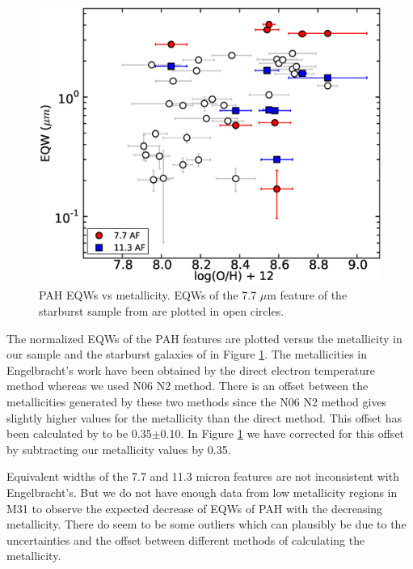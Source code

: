 \documentclass[useAMS,usenatbib,a4paper]{mn2e}
\begin{document}
\begin{figure}

\centering
\includegraphics[scale=0.27]{./oxyvseqw.eps}
\caption{ PAH EQWs vs metallicity. EQWs of the 7.7 $\mu$m feature of the starburst sample from \citet{Engelbracht_2008} are plotted in open circles.}
\label{metalicityVseqw}
\end{figure}

	The normalized EQWs of the PAH features are plotted versus the metallicity in our sample and the starburst galaxies of \citet{Engelbracht_2008} in Figure \ref{metalicityVseqw}. The metallicities in Engelbracht's work have been obtained by the direct electron temperature method \citep{Skillman1998} whereas we used N06 N2 method. There is an offset between the metallicities generated by these two methods since the N06 N2 method gives slightly higher values for the metallicity than the direct method. This offset has been calculated by \citet{Mitchel2014} to be 0.35$\pm$0.10. In Figure \ref{metalicityVseqw} we have corrected for this offset by subtracting our metallicity values by 0.35. 
	
	Equivalent widths of the 7.7 and 11.3 micron features are not inconsistent with Engelbracht's. But we do not have enough data from low metallicity regions in M31 to observe the expected decrease of EQWs of PAH with the decreasing metallicity.  There do seem to be some outliers which can plausibly be due to the uncertainties  and the offset between different methods of calculating the metallicity.  
\end{document}
